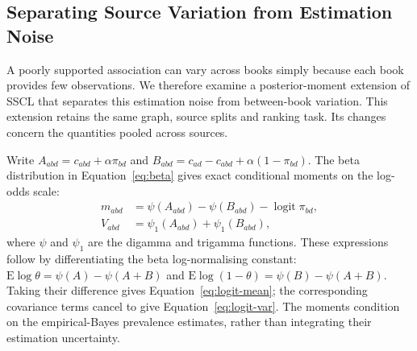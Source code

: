 \documentclass[applsci,article,submit,oneauthor]{Definitions/mdpi}
\newcommand{\logit}{\operatorname{logit}}
\begin{document}
\subsection{Separating Source Variation from Estimation Noise}
\label{sec:posterior-extension}

A poorly supported association can vary across books simply because each book provides few observations. We therefore examine a posterior-moment extension of SSCL that separates this estimation noise from between-book variation. This extension retains the same graph, source splits and ranking task. Its changes concern the quantities pooled across sources.

Write $A_{abd}=c_{abd}+\alpha\pi_{bd}$ and $B_{abd}=c_{ad}-c_{abd}+\alpha(1-\pi_{bd})$. The beta distribution in Equation~\eqref{eq:beta} gives exact conditional moments on the log-odds scale:
\begin{align}
 m_{abd}&=\psi(A_{abd})-\psi(B_{abd})-\logit\pi_{bd},\label{eq:logit-mean}\\
 V_{abd}&=\psi_1(A_{abd})+\psi_1(B_{abd}),\label{eq:logit-var}
\end{align}
where $\psi$ and $\psi_1$ are the digamma and trigamma functions. These expressions follow by differentiating the beta log-normalising constant: $\mathrm E\log\theta=\psi(A)-\psi(A+B)$ and $\mathrm E\log(1-\theta)=\psi(B)-\psi(A+B)$. Taking their difference gives Equation~\eqref{eq:logit-mean}; the corresponding covariance terms cancel to give Equation~\eqref{eq:logit-var}. The moments condition on the empirical-Bayes prevalence estimates, rather than integrating their estimation uncertainty.
\end{document}
